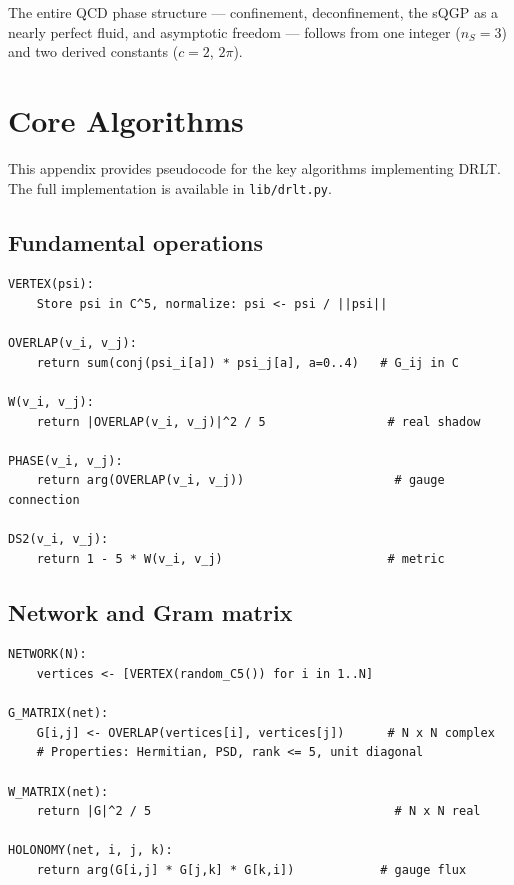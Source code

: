\documentclass[12pt]{article}
\theoremstyle{remark}
\theoremstyle{definition}
\begin{document}
The entire QCD phase structure --- confinement, deconfinement, the sQGP as a nearly perfect fluid, and asymptotic freedom --- follows from one integer ($n_S = 3$) and two derived constants ($c = 2$, $2\pi$).


\section{Core Algorithms}
\label{app:code}

This appendix provides pseudocode for the key algorithms implementing DRLT. The full implementation is available in \texttt{lib/drlt.py}.

\subsection{Fundamental operations}

\begin{verbatim}
VERTEX(psi):
    Store psi in C^5, normalize: psi <- psi / ||psi||

OVERLAP(v_i, v_j):
    return sum(conj(psi_i[a]) * psi_j[a], a=0..4)   # G_ij in C

W(v_i, v_j):
    return |OVERLAP(v_i, v_j)|^2 / 5                 # real shadow

PHASE(v_i, v_j):
    return arg(OVERLAP(v_i, v_j))                     # gauge connection

DS2(v_i, v_j):
    return 1 - 5 * W(v_i, v_j)                       # metric
\end{verbatim}

\subsection{Network and Gram matrix}

\begin{verbatim}
NETWORK(N):
    vertices <- [VERTEX(random_C5()) for i in 1..N]

G_MATRIX(net):
    G[i,j] <- OVERLAP(vertices[i], vertices[j])      # N x N complex
    # Properties: Hermitian, PSD, rank <= 5, unit diagonal

W_MATRIX(net):
    return |G|^2 / 5                                  # N x N real

HOLONOMY(net, i, j, k):
    return arg(G[i,j] * G[j,k] * G[k,i])            # gauge flux
\end{verbatim}
\end{document}

